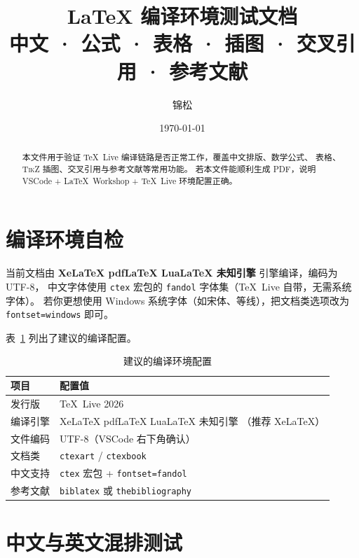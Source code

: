\documentclass[UTF8, a4paper, 11pt, fontset=fandol]{ctexart}
\title{\textbf{LaTeX 编译环境测试文档}\\[4pt]
       \large 中文 · 公式 · 表格 · 插图 · 交叉引用 · 参考文献}
\author{锦松}
\date{\today}
\newcommand{\enginename}{%
  \ifXeTeX Xe\LaTeX%
  \else\ifPDFTeX pdf\LaTeX%
  \else\ifLuaTeX Lua\LaTeX%
  \else 未知引擎%
  \fi\fi\fi}
\begin{document}
\maketitle

\begin{abstract}
本文件用于验证 \TeX\ Live 编译链路是否正常工作，覆盖中文排版、数学公式、
表格、\textsc{TikZ} 插图、交叉引用与参考文献等常用功能。
若本文件能顺利生成 PDF，说明 VSCode + \LaTeX\ Workshop + \TeX\ Live 环境配置正确。
\end{abstract}

\tableofcontents
\bigskip

\section{编译环境自检}
\label{sec:env}

当前文档由 \textbf{\enginename} 引擎编译，编码为 UTF-8，
中文字体使用 \texttt{ctex} 宏包的 \texttt{fandol} 字体集（\TeX\ Live 自带，无需系统字体）。
若你更想使用 Windows 系统字体（如宋体、等线），把文档类选项改为
\texttt{fontset=windows} 即可。

表~\ref{tab:env} 列出了建议的编译配置。

\begin{table}[htbp]
  \centering
  \caption{建议的编译环境配置}
  \label{tab:env}
  \begin{tabular}{@{}ll@{}}
    \toprule
    项目     & 配置值 \\
    \midrule
    发行版   & \TeX\ Live 2026 \\
    编译引擎 & \enginename（推荐 Xe\LaTeX） \\
    文件编码 & UTF-8（VSCode 右下角确认） \\
    文档类   & \texttt{ctexart} / \texttt{ctexbook} \\
    中文支持 & \texttt{ctex} 宏包 + \texttt{fontset=fandol} \\
    参考文献 & \texttt{biblatex} 或 \texttt{thebibliography} \\
    \bottomrule
  \end{tabular}
\end{table}

\section{中文与英文混排测试}
\end{document}
